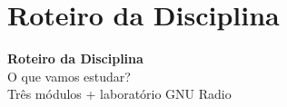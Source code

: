 \documentclass[aspectratio=169]{beamer}
\begin{document}
\section{Roteiro da Disciplina}

{
\begin{frame}[plain,c]
\begin{center}
{\Huge\textbf{Roteiro da Disciplina}}\\[0.8cm]
{\LARGE O que vamos estudar?}\\[0.5cm]
{\large Tr\^{e}s m\'{o}dulos + laborat\'{o}rio GNU Radio}
\end{center}
\end{frame}
}
\end{document}
